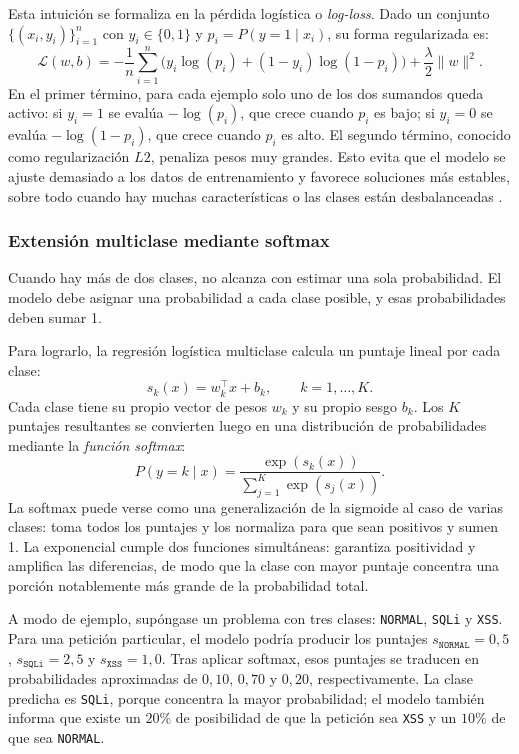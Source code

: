 \documentclass[12pt,oneside]{report}
\begin{document}
Esta intuición se formaliza en la pérdida logística o \textit{log-loss}.
Dado un conjunto $\{(x_i,y_i)\}_{i=1}^n$ con $y_i\in\{0,1\}$ y
$p_i=P(y=1\mid x_i)$, su forma regularizada es:
\[
\mathcal{L}(w,b)=
-\frac{1}{n}\sum_{i=1}^n
\Big(y_i\log(p_i) + (1-y_i)\log(1-p_i)\Big)
+ \frac{\lambda}{2}\lVert w\rVert^2.
\]
En el primer término, para cada ejemplo solo uno de los dos sumandos queda
activo: si $y_i=1$ se evalúa $-\log(p_i)$, que crece cuando $p_i$ es bajo;
si $y_i=0$ se evalúa $-\log(1-p_i)$, que crece cuando $p_i$ es alto. El
segundo término, conocido como regularización $L2$, penaliza pesos muy
grandes. Esto evita que el modelo se ajuste demasiado a los datos de
entrenamiento y favorece soluciones más estables, sobre todo cuando hay
muchas características o las clases están desbalanceadas
\cite{islr_logreg,sklearn_logreg}.

\subsubsection{Extensión multiclase mediante softmax}

Cuando hay más de dos clases, no alcanza con estimar una sola probabilidad.
El modelo debe asignar una probabilidad a cada clase posible, y esas
probabilidades deben sumar 1.

Para lograrlo, la regresión logística multiclase calcula un puntaje lineal
por cada clase:
\[
s_k(x)=w_k^\top x + b_k, \qquad k=1,\dots,K.
\]
Cada clase tiene su propio vector de pesos $w_k$ y su propio sesgo $b_k$.
Los $K$ puntajes resultantes se convierten luego en una distribución de
probabilidades mediante la \textit{función softmax}:
\[
P(y=k\mid x)=\frac{\exp(s_k(x))}{\sum_{j=1}^K \exp(s_j(x))}.
\]
La softmax puede verse como una generalización de la sigmoide al caso de
varias clases: toma todos los puntajes y los normaliza para que sean
positivos y sumen 1. La exponencial cumple dos funciones simultáneas:
garantiza positividad y amplifica las diferencias, de modo que la clase con
mayor puntaje concentra una porción notablemente más grande de la
probabilidad total.

A modo de ejemplo, supóngase un problema con tres clases: \texttt{NORMAL},
\texttt{SQLi} y \texttt{XSS}. Para una petición particular, el modelo podría
producir los puntajes $s_{\texttt{NORMAL}}=0{,}5$, $s_{\texttt{SQLi}}=2{,}5$
y $s_{\texttt{XSS}}=1{,}0$. Tras aplicar softmax, esos puntajes se traducen
en probabilidades aproximadas de $0{,}10$, $0{,}70$ y $0{,}20$,
respectivamente. La clase predicha es \texttt{SQLi}, porque concentra la
mayor probabilidad; el modelo también informa que existe un $20\%$ de
posibilidad de que la petición sea \texttt{XSS} y un $10\%$ de que sea
\texttt{NORMAL}.
\end{document}
